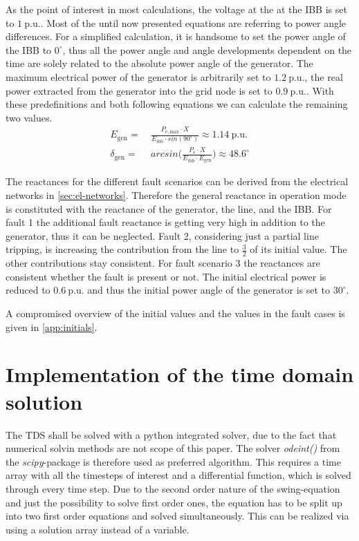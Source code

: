 As the point of interest in most calculations, the voltage at the at the \acs{IBB} is set to $1~\mathrm{p.u.}$. Most of the until now presented equations are referring to power angle differences. For a simplified calculation, it is handsome to set the power angle of the \acs{IBB} to $0^\circ$, thus all the power angle and angle developments dependent on the time are solely related to the absolute power angle of the generator. The maximum electrical power of the generator is arbitrarily set to $1.2~\mathrm{p.u.}$, the real power extracted from the generator into the grid node is set to $0.9~\mathrm{p.u.}$. With these predefinitions and both following equations we can calculate the remaining two values.
\begin{align}
        E_\mathrm{gen}=&~\frac{P_\mathrm{e,max} \cdot X}{E_\mathrm{ibb} \cdot sin(90^\circ)} \approx 1.14~\mathrm{p.u.} \nonumber \\[6pt]
        \delta_\mathrm{gen}=&~arcsin\Bigg(\frac{P_\mathrm{e} \cdot X}{E_\mathrm{ibb} \cdot E_\mathrm{gen}}\Bigg) \approx 48.6^\circ \nonumber
\end{align}

The reactances for the different fault scenarios can be derived from the electrical networks in \autoref{sec:el-networks}. Therefore the general reactance in operation mode is constituted with the reactance of the generator, the line, and the \acs{IBB}. For fault 1 the additional fault reactance is getting very high in addition to the generator, thus it can be neglected. Fault 2, considering just a partial line tripping, is increasing the contribution from the line to $\frac{3}{2}$ of its initial value. The other contributions stay consistent. For fault scenario 3 the reactances are consistent whether the fault is present or not. The initial electrical power is reduced to  $0.6~\mathrm{p.u.}$ and thus the initial power angle of the generator is set to $30^\circ$.

A compromised overview of the initial values and the values in the fault cases is given in \autoref{app:initials}.

\section{Implementation of the time domain solution}
\label{sec:tds}

The \acs{TDS} shall be solved with a python integrated solver, due to the fact that numerical solvin methods are not scope of this paper. The solver {\itshape odeint()} from the {\itshape scipy}-package is therefore used as preferred algorithm. This requires a time array with all the timesteps of interest and a differential function, which is solved through every time step. Due to the second order nature of the swing-equation and just the possibility to solve first order ones, the equation has to be split up into two first order equations and solved simultaneously. This can be realized via using a solution array instead of a variable. 

